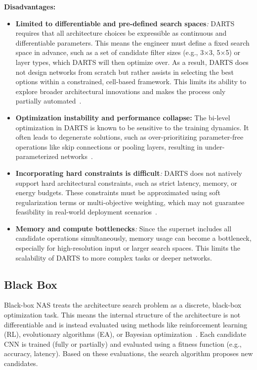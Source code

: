 \textbf{Disadvantages:}
\begin{itemize}
    \item \textbf{Limited to differentiable and pre-defined search spaces}\textit{:} DARTS requires that all architecture choices be expressible as continuous and differentiable parameters. This means the engineer must define a fixed search space in advance, such as a set of candidate filter sizes (e.g., 3×3, 5×5) or layer types, which DARTS will then optimize over. As a result, DARTS does not design networks from scratch but rather assists in selecting the best options within a constrained, cell-based framework. This limits its ability to explore broader architectural innovations and makes the process only partially automated~\cite{elsken2019neural}.

    
    \item \textbf{Optimization instability and performance collapse:} The bi-level optimization in DARTS is known to be sensitive to the training dynamics. It often leads to degenerate solutions, such as over-prioritizing parameter-free operations like skip connections or pooling layers, resulting in under-parameterized networks~\cite{zela2020understanding}.
    
    \item \textbf{Incorporating hard constraints is difficult}\textit{:} DARTS does not natively support hard architectural constraints, such as strict latency, memory, or energy budgets. These constraints must be approximated using soft regularization terms or multi-objective weighting, which may not guarantee feasibility in real-world deployment scenarios~\cite{king2025micronas}.
    
    \item \textbf{Memory and compute bottlenecks}\textit{:} Since the supernet includes all candidate operations simultaneously, memory usage can become a bottleneck, especially for high-resolution input or larger search spaces. This limits the scalability of DARTS to more complex tasks or deeper networks.
\end{itemize}


\subsection{Black Box}
Black-box NAS treats the architecture search problem as a discrete, black-box optimization task. This means the internal structure of the architecture is not differentiable and is instead evaluated using methods like reinforcement learning (RL), evolutionary algorithms (EA), or Bayesian optimization~\cite{qiu2023shortest}. Each candidate CNN is trained (fully or partially) and evaluated using a fitness function (e.g., accuracy, latency). Based on these evaluations, the search algorithm proposes new candidates.

